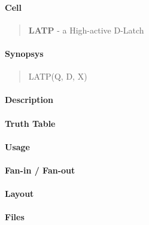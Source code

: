 \label{LATP}
\paragraph{Cell}
\begin{quote}
    \textbf{LATP} - a High-active D-Latch
\end{quote}

\paragraph{Synopsys}
\begin{quote}
    LATP(Q, D, X)
\end{quote}

\paragraph{Description}

%

\paragraph{Truth Table}
%

\paragraph{Usage}

\paragraph{Fan-in / Fan-out}

\paragraph{Layout}

\paragraph{Files}

\clearpage
